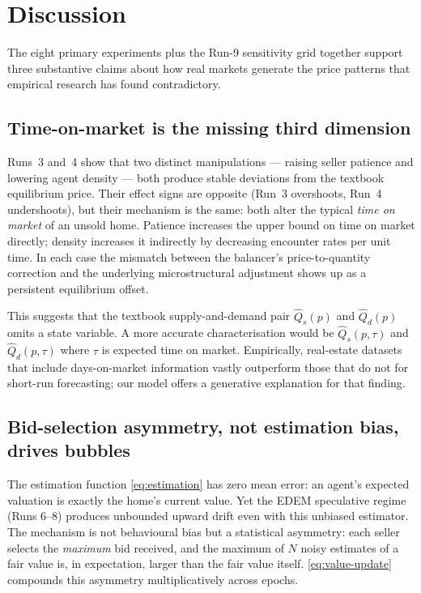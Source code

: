 \section{Discussion}
\label{sec:discussion}

The eight primary experiments plus the Run-9 sensitivity grid
together support three substantive claims about
how real markets generate the price patterns that empirical research
has found contradictory.

\subsection{Time-on-market is the missing third dimension}
\label{sec:disc-tom}

Runs~3 and~4 show that two distinct manipulations --- raising seller
patience and lowering agent density --- both produce stable
deviations from the textbook equilibrium price. Their effect signs
are opposite (Run~3 overshoots, Run~4 undershoots), but their
mechanism is the same: both alter the typical \emph{time on market}
of an unsold home. Patience increases the upper bound on time on
market directly; density increases it indirectly by decreasing
encounter rates per unit time. In each case the mismatch between the
balancer's price-to-quantity correction and the underlying microstructural
adjustment shows up as a persistent equilibrium offset.

This suggests that the textbook supply-and-demand pair $\hat{Q}_{s}(p)$
and $\hat{Q}_{d}(p)$ omits a state variable. A more accurate
characterisation would be $\hat{Q}_{s}(p, \tau)$ and
$\hat{Q}_{d}(p, \tau)$ where $\tau$ is expected time on market.
Empirically, real-estate datasets that include days-on-market
information vastly outperform those that do not for short-run
forecasting; our model offers a generative explanation for that
finding.

\subsection{Bid-selection asymmetry, not estimation bias, drives bubbles}
\label{sec:disc-bias}

The estimation function \cref{eq:estimation} has zero mean error: an
agent's expected valuation is exactly the home's current value. Yet
the EDEM speculative regime (Runs 6--8) produces unbounded upward
drift even with this unbiased estimator. The mechanism is not
behavioural bias but a statistical asymmetry: each seller selects the
\emph{maximum} bid received, and the maximum of $N$ noisy estimates
of a fair value is, in expectation, larger than the fair value
itself. \cref{eq:value-update} compounds this asymmetry
multiplicatively across epochs.

